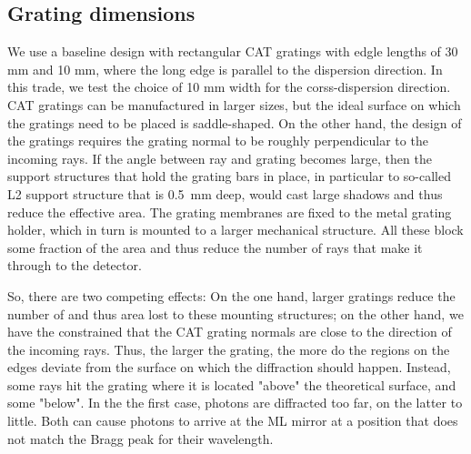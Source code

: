 \documentclass[]{spie}  %
\begin{document}
\subsection{Grating dimensions}
We use a baseline design with rectangular CAT gratings with edgle lengths of 30 mm and 10 mm, where the long edge is parallel to the dispersion direction. In this trade, we test the choice of 10 mm width for the corss-dispersion direction. CAT gratings can be manufactured in larger sizes, but the ideal surface on which the gratings need to be placed is saddle-shaped. On the other hand, the design of the gratings requires the grating normal to be roughly perpendicular to the incoming rays. If the angle between ray and grating becomes large, then the support structures that hold the grating bars in place, in particular to so-called L2 support structure that is 0.5~mm deep, would cast large shadows and thus reduce the effective area. The grating membranes are fixed to the metal grating holder, which in turn is mounted to a larger mechanical structure. All these block some fraction of the area and thus reduce the number of rays that make it through to the detector.

So, there are two competing effects: On the one hand, larger gratings reduce the number of and thus area lost to these mounting structures; on the other hand, we have the constrained that the CAT grating normals are close to the direction of the incoming rays. Thus, the larger the grating, the more do the regions on the edges deviate from the surface on which the diffraction should happen. Instead, some rays hit the grating where it is located "above" the theoretical surface, and some "below". In the the first case, photons are diffracted too far, on the latter to little. Both can cause photons to arrive at the ML mirror at a position that does not match the Bragg peak for their wavelength.
\end{document}
